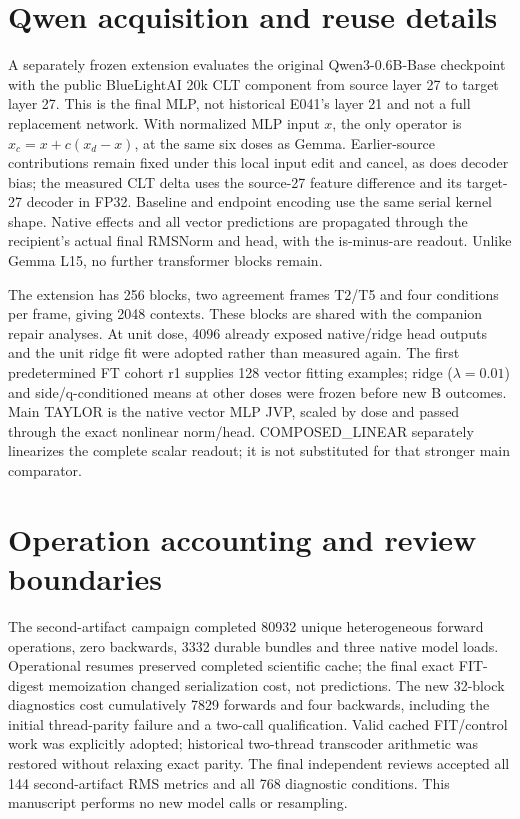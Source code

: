 \section{Qwen acquisition and reuse details}\label{app:qwenimplementation}
A separately frozen extension evaluates the original Qwen3-0.6B-Base checkpoint with the public BlueLightAI 20k CLT component from source layer 27 to target layer 27. This is the final MLP, not historical E041's layer 21 and not a full replacement network. With normalized MLP input $x$, the only operator is $x_c=x+c(x_d-x)$, at the same six doses as Gemma. Earlier-source contributions remain fixed under this local input edit and cancel, as does decoder bias; the measured CLT delta uses the source-27 feature difference and its target-27 decoder in FP32. Baseline and endpoint encoding use the same serial kernel shape. Native effects and all vector predictions are propagated through the recipient's actual final RMSNorm and head, with the is-minus-are readout. Unlike Gemma L15, no further transformer blocks remain.

The extension has 256 blocks, two agreement frames T2/T5 and four conditions per frame, giving 2048 contexts. These blocks are shared with the companion repair analyses. At unit dose, 4096 already exposed native/ridge head outputs and the unit ridge fit were adopted rather than measured again. The first predetermined FT cohort r1 supplies 128 vector fitting examples; ridge ($\lambda=0.01$) and side/q-conditioned means at other doses were frozen before new B outcomes. Main TAYLOR is the native vector MLP JVP, scaled by dose and passed through the exact nonlinear norm/head. COMPOSED\_LINEAR separately linearizes the complete scalar readout; it is not substituted for that stronger main comparator.

\section{Operation accounting and review boundaries}\label{app:costs}
The second-artifact campaign completed 80932 unique heterogeneous forward operations, zero backwards, 3332 durable bundles and three native model loads. Operational resumes preserved completed scientific cache; the final exact FIT-digest memoization changed serialization cost, not predictions. The new 32-block diagnostics cost cumulatively 7829 forwards and four backwards, including the initial thread-parity failure and a two-call qualification. Valid cached FIT/control work was explicitly adopted; historical two-thread transcoder arithmetic was restored without relaxing exact parity. The final independent reviews accepted all 144 second-artifact RMS metrics and all 768 diagnostic conditions. This manuscript performs no new model calls or resampling.

